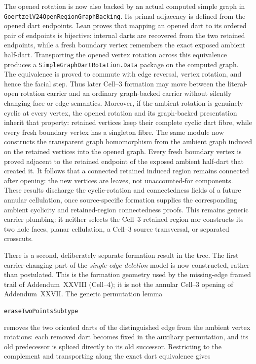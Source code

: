 \documentclass[11pt]{article}
\theoremstyle{definition}
\begin{document}
The opened rotation is now also backed by an actual computed simple graph in
\texttt{GoertzelV24OpenRegionGraphBacking}.  Its primal adjacency is defined
from the opened dart endpoints.  Lean proves that mapping an opened dart to
its ordered pair of endpoints is bijective: internal darts are recovered from
the two retained endpoints, while a fresh boundary vertex remembers the exact
exposed ambient half-dart.  Transporting the opened vertex rotation across
this equivalence produces a \texttt{SimpleGraphDartRotation.Data} package on
the computed graph.  The equivalence is proved to commute with edge reversal,
vertex rotation, and hence the facial step.  Thus later Cell--3 formation may
move between the literal-open rotation carrier and an ordinary graph-backed
carrier without silently changing face or edge semantics.  Moreover, if the
ambient rotation is genuinely cyclic at every vertex, the opened rotation and
its graph-backed presentation inherit that property: retained vertices keep
their complete cyclic dart fibre, while every fresh boundary vertex has a
singleton fibre.  The same module now constructs the transparent graph
homomorphism from the ambient graph induced on the retained vertices into the
opened graph.  Every fresh boundary vertex is proved adjacent to the retained
endpoint of the exposed ambient half-dart that created it.  It follows that a
connected retained induced region remains connected after opening: the new
vertices are leaves, not unaccounted-for components.  These results discharge
the cyclic-rotation and connectedness fields of a future annular cellulation,
once source-specific formation supplies the corresponding ambient cyclicity
and retained-region connectedness proofs.  This remains generic carrier
plumbing: it neither selects the Cell--3 retained region nor constructs its two
hole faces, planar cellulation, a Cell--3 source transversal, or separated
crosscuts.

There is a second, deliberately separate formation result in the tree.  The
first carrier-changing part of the \emph{single-edge deletion} model is now
constructed, rather than postulated.  This is the formation geometry used by
the missing-edge framed trail of Addendum~XXVIII (Cell--4); it is not the
annular Cell--3 opening of Addendum~XXVII.  The generic permutation lemma

\begin{center}
\texttt{eraseTwoPointsSubtype}
\end{center}

removes the two oriented darts of the distinguished edge from the ambient
vertex rotations: each removed dart becomes fixed in the auxiliary
permutation, and its old predecessor is spliced directly to its old successor.
Restricting to the complement and transporting along the exact dart
equivalence gives
\end{document}
